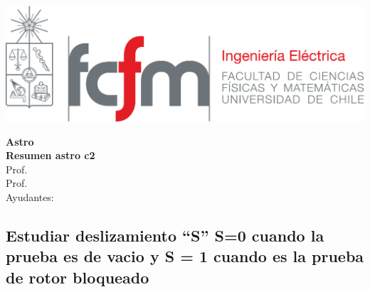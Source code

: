 \documentclass[
  11pt,
  letterpaper,
  answers
]{exam}
\begin{document}
\begin{minipage}{0.42\textwidth}
    \includegraphics[width=\textwidth]{../fcfm_die}
\end{minipage}
\begin{minipage}{0.53\textwidth}
\begin{center} 
\large\textbf{Astro}  \\
\large\textbf{Resumen astro c2} \\
\normalsize Prof.~\\
\normalsize Prof.~\\
\normalsize Ayudantes: 
\end{center}
\end{minipage}

\vspace{0.5cm}
\noindent
\vspace{.85cm}




\begin{parts}
    \part{Estudiar deslizamiento ``S''  S=0 cuando la prueba es de vacio y S = 1 cuando es la prueba de rotor bloqueado}



\end{parts}
\end{document}
